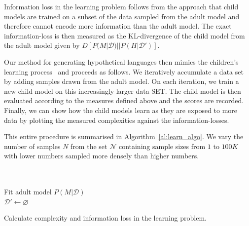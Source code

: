 \documentclass[11pt]{article}
\begin{document}



Information loss in the learning problem follows from the approach that child models are trained on a subset of the data sampled from the adult model and therefore cannot encode more information than the adult model. 
The exact information-loss is then measured as the KL-divergence of the child model from the adult model given by $D[P(M|\mathcal{D})||P(H|\mathcal{D}')]$.

Our method for generating hypothetical languages then mimics the children's learning process~\cite{mollica2021logical} and proceeds as follows. 
We iteratively accumulate a data set by adding samples drawn from the adult model. 
On each iteration, we train a new child model on this increasingly larger data SET. 
The child model is then evaluated according to the measures defined above and the scores are recorded. 
Finally, we can show how the child models learn as they are exposed to more data by plotting the measured complexities against the information-losses. 

This entire procedure is summarised in Algorithm~\ref{al:learn_algo}. We vary the number of samples $N$ from the set $\mathcal{N}$ containing sample sizes from $1$ to $100K$ with lower numbers sampled more densely than higher numbers.

\begin{algorithm}
    \SetAlgoLined
     \\
     \\
    Fit adult model $P(M|\mathcal{D})$ \\
    $\mathcal{D}' \gets \varnothing$ \\
 \caption{Calculate complexity and information loss in the learning problem.}
 \label{al:learn_algo}
\end{algorithm}
\end{document}
